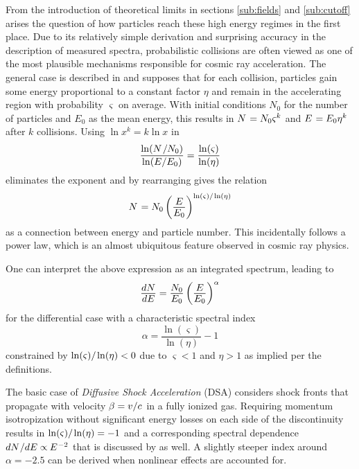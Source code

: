 From the introduction of theoretical limits in sections \ref{sub:fields} and \ref{sub:cutoff} arises the question of how
particles reach these high energy regimes in the first place. Due to its relatively simple derivation and surprising accuracy
in the description of measured spectra, probabilistic collisions are often viewed as one of the most plausible mechanisms
responsible for cosmic ray acceleration. The general case is described in \cite{Longair_2011} and supposes that for each
collision, particles gain some energy proportional to a constant factor $\eta$ and remain in the accelerating region with
probability $\varsigma$ on average. With initial conditions $N_0$ for the number of particles and $E_0$ as the mean
energy, this results in $N \kern+0.9pt = N_0 \varsigma^k$ and $E \kern+0.9pt = E_0 \eta^k$ after $k$ collisions. Using
$\ln x^k = k\ln x$ in
\begin{equation*}
	\frac{\ln (N \kern+1.0pt / N_0)}{\ln (E / E_0)} = \frac{\ln(\varsigma)}{\ln(\eta)}
\end{equation*}
eliminates the exponent and by rearranging gives the relation
\begin{equation*}
	N \kern+0.9pt = N_0 \left( \frac{\raisebox{-0.3ex}{$E$}}{\raisebox{0.3ex}{$E_0$}} \right)^{\ln(\varsigma) / \kern-0.5pt \ln(\eta)}
\end{equation*}
as a connection between energy and particle number. This incidentally follows a power law, which is an almost ubiquitous feature
observed in cosmic ray physics.

\newpage

One can interpret the above expression as an integrated spectrum, leading to
\begin{equation*}
	\frac{\raisebox{-0.3ex}{$dN$}}{\raisebox{0.3ex}{$dE$}} = \frac{\raisebox{-0.3ex}{$N_0$}}{\raisebox{0.3ex}{$E_0$}}
	\left( \frac{\raisebox{-0.3ex}{$E$}}{\raisebox{0.3ex}{$E_0$}} \right)^\alpha
\end{equation*}
for the differential case with a characteristic spectral index
\begin{equation*}
	\alpha = \frac{\ln(\varsigma)}{\ln(\eta)} - 1
\end{equation*}
constrained by $\ln(\varsigma) / \kern-0.5pt \ln(\eta) < 0$ due to $\varsigma < 1$ and $\eta > 1$ as implied per the definitions.

The basic case of \emph{Diffusive Shock Acceleration} (DSA) considers shock fronts that propagate with velocity
$\kern-0.5pt \beta = v / c \kern+1.0pt$ in a fully ionized gas. Requiring momentum isotropization without significant energy losses
on each side of the discontinuity results in $\ln(\varsigma) / \kern-0.5pt \ln(\eta) = -1$ and a corresponding spectral dependence
$dN \kern+0.5pt / dE \propto \kern-0.5pt E^{\kern+0.5pt -2}$ that is discussed by \cite{Longair_2011} as well. A slightly steeper
index around $\alpha = \num{-2.5}$ can be derived when nonlinear effects are accounted for.

